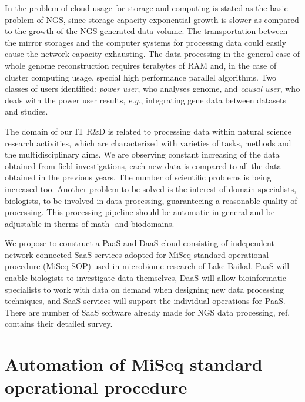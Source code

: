 \documentclass[a4paper]{jpconf}
\begin{document}
In \cite{guo16} the problem of cloud usage for storage and computing is stated as the basic problem of NGS, since storage capacity exponential growth is slower as compared to the growth of the NGS generated data volume. The transportation between the mirror storages and the computer systems for processing data could easily cause the network capacity exhausting. The data processing in the general case of whole genome reconstruction requires terabytes of RAM and, in the case of cluster computing usage, special high performance parallel algorithms. Two classes of users identified: \emph{power user}, who analyses genome, and \emph{causal user}, who deals with the power user results, \emph{e.g.}, integrating gene data between datasets and studies.



The domain of our IT R\&D is related to processing data within natural science research activities, which are characterized with varieties of tasks, methods and the multidisciplinary aims. %
We are observing constant increasing of the data obtained from field investigations, each new data is compared to all the data obtained in the previous years. The number of scientific problems is being increased too. Another problem to be solved is the interest of domain specialists, biologists, to be involved in data processing, guaranteeing a reasonable quality of processing.  This processing pipeline should be automatic in general and be adjustable in therms of math- and biodomains.

We propose to construct a PaaS and DaaS cloud consisting of independent network connected SaaS-services adopted for MiSeq standard operational procedure (MiSeq SOP) used in microbiome research of Lake Baikal. PaaS will enable biologists to investigate data themselves, DaaS will allow bioinformatic specialists to work with data on demand when designing new data processing techniques, and SaaS services will support the individual operations for PaaS. There are number of SaaS software already made for NGS data processing, ref.~\cite{guo16} contains their detailed survey. %


\section{Automation of MiSeq standard operational procedure}
\label{sec:sop}
\end{document}
